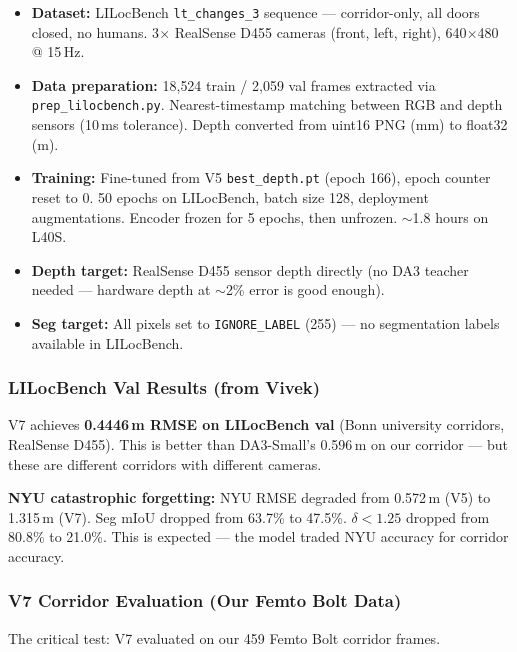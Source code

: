 \documentclass[11pt,a4paper]{article}
\begin{document}
\begin{itemize}[nosep]
  \item \textbf{Dataset:} LILocBench \texttt{lt\_changes\_3} sequence --- corridor-only,
    all doors closed, no humans. 3$\times$ RealSense D455 cameras (front, left, right),
    640$\times$480 @ 15\,Hz.
  \item \textbf{Data preparation:} 18{,}524 train / 2{,}059 val frames extracted via
    \texttt{prep\_lilocbench.py}. Nearest-timestamp matching between RGB and depth
    sensors (10\,ms tolerance). Depth converted from uint16 PNG (mm) to float32 (m).
  \item \textbf{Training:} Fine-tuned from V5 \texttt{best\_depth.pt} (epoch 166),
    epoch counter reset to 0. 50 epochs on LILocBench, batch size 128, deployment
    augmentations. Encoder frozen for 5 epochs, then unfrozen. $\sim$1.8 hours on L40S.
  \item \textbf{Depth target:} RealSense D455 sensor depth directly (no DA3 teacher
    needed --- hardware depth at $\sim$2\% error is good enough).
  \item \textbf{Seg target:} All pixels set to \texttt{IGNORE\_LABEL} (255) --- no
    segmentation labels available in LILocBench.
\end{itemize}

\subsubsection{LILocBench Val Results (from Vivek)}

V7 achieves \textbf{0.4446\,m RMSE on LILocBench val} (Bonn university corridors,
RealSense D455). This is better than DA3-Small's 0.596\,m on our corridor ---
but these are different corridors with different cameras.

\textbf{NYU catastrophic forgetting:} NYU RMSE degraded from 0.572\,m (V5) to
1.315\,m (V7). Seg mIoU dropped from 63.7\% to 47.5\%. $\delta < 1.25$ dropped
from 80.8\% to 21.0\%. This is expected --- the model traded NYU accuracy for
corridor accuracy.

\subsubsection{V7 Corridor Evaluation (Our Femto Bolt Data)}

The critical test: V7 evaluated on our 459 Femto Bolt corridor frames.
\end{document}
